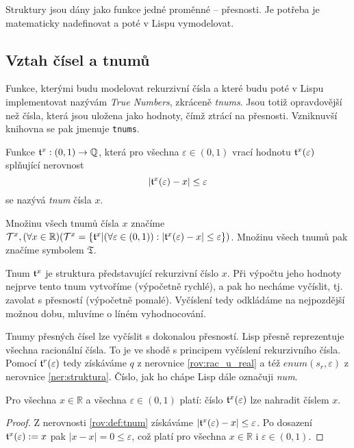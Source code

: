 Struktury jsou dány jako funkce jedné proměnné -- přesnosti. Je potřeba je matematicky nadefinovat a poté v Lispu vymodelovat.

\subsection{Vztah čísel a tnumů}
Funkce, kterými budu modelovat rekurzivní čísla a které budu poté v Lispu implementovat nazývám \textit{True Numbers}, zkráceně \textit{tnums}. Jsou totiž opravdovější než čísla, která jsou uložena jako hodnoty, čímž ztrácí na přesnosti. Vzniknuvší knihovna se pak jmenuje \texttt{tnums}.

\begin{definition}[Tnum]\label{def:tnum}
Funkce $\mathfrak{t}^{x}:(0,1)\rightarrow\mathbb{Q}$, která pro všechna $\varepsilon\in (0,1)$ vrací hodnotu $\mathfrak{t}^{x}(\varepsilon)$ splňující nerovnost
\begin{equation}\label{rov:def:tnum}
|\mathfrak{t}^{x}(\varepsilon) - x |\leq \varepsilon
\end{equation}
se nazývá \textit{tnum} \normalfont{[ti:n{\textturnv}m]} čísla $x$.

Množinu všech tnumů čísla $x$ značíme $\mathcal{T}^{x},(\forall x \in\mathbb{R})(\mathcal{T}^{x}=\{\mathfrak{t}^{x}|(\forall\varepsilon\in (0,1)):|\mathfrak{t}^{x}(\varepsilon)-x|\leq\varepsilon\})$. Množinu všech tnumů pak značíme symbolem $\mathfrak{T}$.
\end{definition}

Tnum $\mathfrak{t}^{x}$ je struktura představující rekurzivní číslo $x$. Při výpočtu jeho hodnoty nejprve tento tnum vytvoříme (výpočetně rychlé), a pak ho necháme vyčíslit, tj. zavolat s přesností (výpočetně pomalé). Vyčíslení tedy odkládáme na nejpozdější možnou dobu, mluvíme o líném vyhodnocování.

Tnumy přesných čísel lze vyčíslit s dokonalou přesností. Lisp přesně reprezentuje všechna racionální čísla. To je ve shodě s principem vyčíslení rekurzivního čísla. Pomocí $\mathfrak{t}^{r}(\varepsilon)$ tedy získáváme $q$ z nerovnice \eqref{rov:rac_u_real} a též $enum(s_r,\varepsilon)$ z nerovnice \eqref{ner:struktura}. Číslo, jak ho chápe Lisp dále označuji \textit{num}.

\begin{lemma}\label{lem:num-to-tnum}
Pro všechna $x\in\mathbb{R}$ a všechna $\varepsilon \in (0,1)$ platí: číslo $\mathfrak{t}^{x}(\varepsilon)$ lze nahradit číslem $x$.
\begin{proof}
Z nerovnosti \eqref{rov:def:tnum} získáváme $|\mathfrak{t}^{x}(\varepsilon) - x |\leq \varepsilon$. Po dosazení $\mathfrak{t}^{x}(\varepsilon) := x$ pak $|x - x | = 0 \leq \varepsilon$, což platí pro všechna $x\in\mathbb{R}$ i $\varepsilon\in{(0,1)}$.
\end{proof}
\end{lemma}

